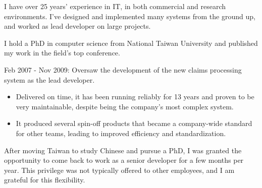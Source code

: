 \documentclass[10pt,a4paper]{../altacv}
\begin{document}

\begin{fullwidth}
\makecvheader

I have over 25 years' experience in IT, in both commercial and research environments. I've designed and implemented many systems from the ground up, and worked as lead developer on large projects.

I hold a PhD in computer science from National Taiwan University and published my work in the field's top conference.

\end{fullwidth}



Feb 2007 - Nov 2009: Oversaw the development of the new claims processing system as the lead developer.
\begin{itemize}
	\item\small{Delivered on time, it has been running reliably for 13 years and proven to be very maintainable, despite being the company's most complex system.}
	\item\small{It produced several spin-off products that became a company-wide standard for other teams, leading to improved efficiency and standardization.}
\end{itemize}

\medskip

After moving Taiwan to study Chinese and pursue a PhD, I was granted the opportunity to come back to work as a senior developer for a few months per year. This privilege was not typically offered to other employees, and I am grateful for this flexibility.
\end{document}

